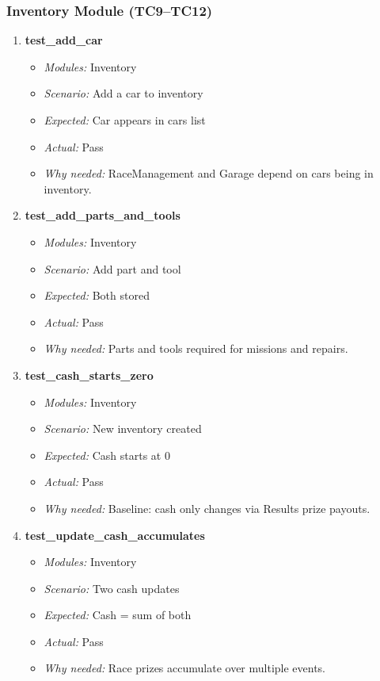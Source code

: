 \documentclass{article}
\begin{document}
\subsubsection*{Inventory Module (TC9--TC12)}
\begin{enumerate}[resume, label=\textbf{TC\arabic*.}]

\item \textbf{test\_add\_car}
\begin{itemize}[noitemsep]
  \item \textit{Modules:} Inventory
  \item \textit{Scenario:} Add a car to inventory
  \item \textit{Expected:} Car appears in cars list
  \item \textit{Actual:} Pass
  \item \textit{Why needed:} RaceManagement and Garage depend on cars being in inventory.
\end{itemize}

\item \textbf{test\_add\_parts\_and\_tools}
\begin{itemize}[noitemsep]
  \item \textit{Modules:} Inventory
  \item \textit{Scenario:} Add part and tool
  \item \textit{Expected:} Both stored
  \item \textit{Actual:} Pass
  \item \textit{Why needed:} Parts and tools required for missions and repairs.
\end{itemize}

\item \textbf{test\_cash\_starts\_zero}
\begin{itemize}[noitemsep]
  \item \textit{Modules:} Inventory
  \item \textit{Scenario:} New inventory created
  \item \textit{Expected:} Cash starts at 0
  \item \textit{Actual:} Pass
  \item \textit{Why needed:} Baseline: cash only changes via Results prize payouts.
\end{itemize}

\item \textbf{test\_update\_cash\_accumulates}
\begin{itemize}[noitemsep]
  \item \textit{Modules:} Inventory
  \item \textit{Scenario:} Two cash updates
  \item \textit{Expected:} Cash = sum of both
  \item \textit{Actual:} Pass
  \item \textit{Why needed:} Race prizes accumulate over multiple events.
\end{itemize}

\end{enumerate}
\end{document}
